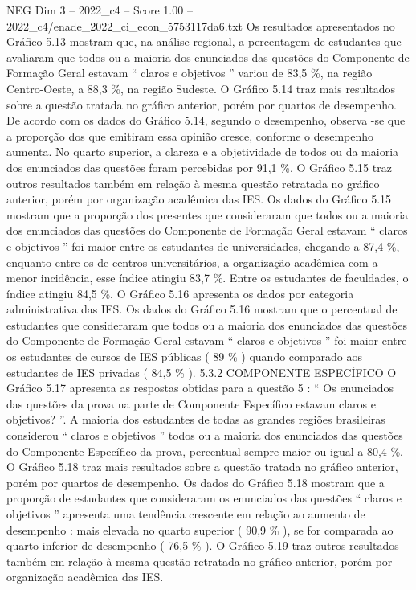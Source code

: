 \begin{textsample}{NEG Dim 3 – 2022\_c4 – Score 1.00 – 2022\_c4/enade\_2022\_ci\_econ\_5753117da6.txt}
Os resultados apresentados no Gráfico 5.13 mostram que, na análise regional, a percentagem de estudantes que avaliaram que todos ou a maioria dos enunciados das questões do Componente de Formação Geral estavam “ claros e objetivos ” variou de 83,5 \%, na região Centro-Oeste, a 88,3 \%, na região Sudeste.
O Gráfico 5.14 traz mais resultados sobre a questão tratada no gráfico anterior, porém por quartos de desempenho.
De acordo com os dados do Gráfico 5.14, segundo o desempenho, observa -se que a proporção dos que emitiram essa opinião cresce, conforme o desempenho aumenta.
No quarto superior, a clareza e a objetividade de todos ou da maioria dos enunciados das questões foram percebidas por 91,1 \%.
O Gráfico 5.15 traz outros resultados também em relação à mesma questão retratada no gráfico anterior, porém por organização acadêmica das IES.
Os dados do Gráfico 5.15 mostram que a proporção dos presentes que consideraram que todos ou a maioria dos enunciados das questões do Componente de Formação Geral estavam “ claros e objetivos ” foi maior entre os estudantes de universidades, chegando a 87,4 \%, enquanto entre os de centros universitários, a organização acadêmica com a menor incidência, esse índice atingiu 83,7 \%.
Entre os estudantes de faculdades, o índice atingiu 84,5 \%.
O Gráfico 5.16 apresenta os dados por categoria administrativa das IES.
Os dados do Gráfico 5.16 mostram que o percentual de estudantes que consideraram que todos ou a maioria dos enunciados das questões do Componente de Formação Geral estavam “ claros e objetivos ” foi maior entre os estudantes de cursos de IES públicas ( 89 \% ) quando comparado aos estudantes de IES privadas ( 84,5 \% ). 5.3.2 COMPONENTE ESPECÍFICO O Gráfico 5.17 apresenta as respostas obtidas para a questão 5 : “ Os enunciados das questões da prova na parte de Componente Específico estavam claros e objetivos? ”.
A maioria dos estudantes de todas as grandes regiões brasileiras considerou “ claros e objetivos ” todos ou a maioria dos enunciados das questões do Componente Específico da prova, percentual sempre maior ou igual a 80,4 \%.
O Gráfico 5.18 traz mais resultados sobre a questão tratada no gráfico anterior, porém por quartos de desempenho.
Os dados do Gráfico 5.18 mostram que a proporção de estudantes que consideraram os enunciados das questões “ claros e objetivos ” apresenta uma tendência crescente em relação ao aumento de desempenho : mais elevada no quarto superior ( 90,9 \% ), se for comparada ao quarto inferior de desempenho ( 76,5 \% ).
O Gráfico 5.19 traz outros resultados também em relação à mesma questão retratada no gráfico anterior, porém por organização acadêmica das IES.

\end{textsample}
